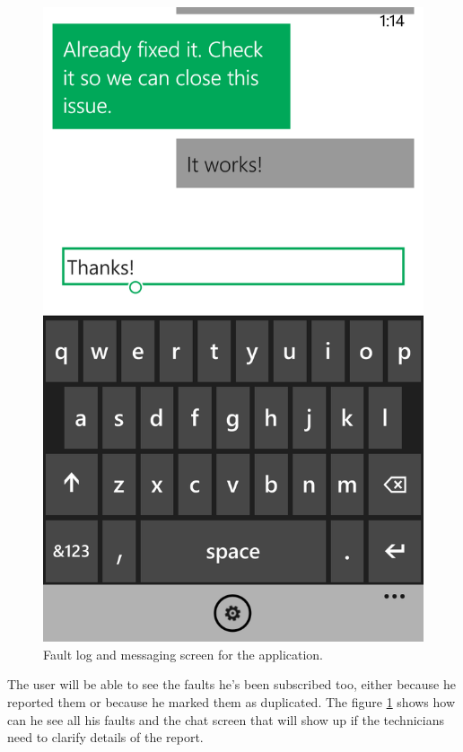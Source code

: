 \documentclass{report}
\begin{document}
\begin{figure}[hbtp]
\begin{minipage}{0.3\textwidth}
\includegraphics[width=\textwidth]{img/Messaging.png}
\end{minipage}
\caption{Fault log and messaging screen for the application.}
\label{imgTracking}
\end{figure}

The user will be able to see the faults he's been subscribed too, either because he reported them or because he marked them as duplicated. The figure \ref{imgTracking} shows how can he see all his faults and the chat screen that will show up if the technicians need to clarify details of the report.
\end{document}
